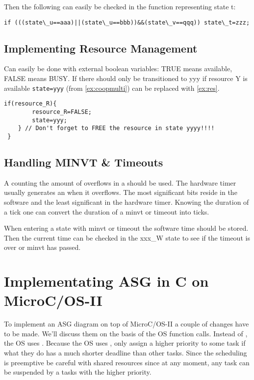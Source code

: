 Then the following can easily be checked in the function representing state t:
\begin{center}
\lstinline{if (((state\_u==aaa)||(state\_u==bbb))&&(state\_v==qqq)) state\_t=zzz;}
\end{center}

\subsection{Implementing Resource Management}
Can easily be done with external boolean variables: TRUE means available, FALSE means BUSY.
If there should only be transitioned to yyy if resource Y is available \lstinline{state=yyy} (from \ref{ex:coopmulti}) can be replaced with \ref{ex:res}.

\begin{lstlisting}[caption=Example of implementing resource management., label=ex:res]
	if(resource_R){
		resource_R=FALSE;
		state=yyy;
	} // Don't forget to FREE the resource in state yyyy!!!!
 }
\end{lstlisting}
\subsection{Handling MINVT \& Timeouts}
A  counting the amount of overflows in a  should be used.
The hardware timer usually generates an  when it overflows.
The most significant bits reside in the software and the least significant in the hardware timer.
Knowing the duration of a tick one can convert the duration of a minvt or timeout into ticks.

When entering a state with minvt or timeout the software time should be stored.
Then the current time can be checked in the xxx\_W state to see if the timeout is over or minvt has passed.


\section{Implementating ASG in C on MicroC/OS-II}

To implement an ASG diagram on top of MicroC/OS-II a couple of changes have to be made.
We'll discuss them on the basis of the OS function calls.
Instead of , the OS uses .
Because the OS uses , only assign a higher priority to some task if what they do has a much shorter deadline than other tasks.
Since the scheduling is preemptive be careful with shared resources since at any moment, any task can be suspended by a tasks with the higher priority.

